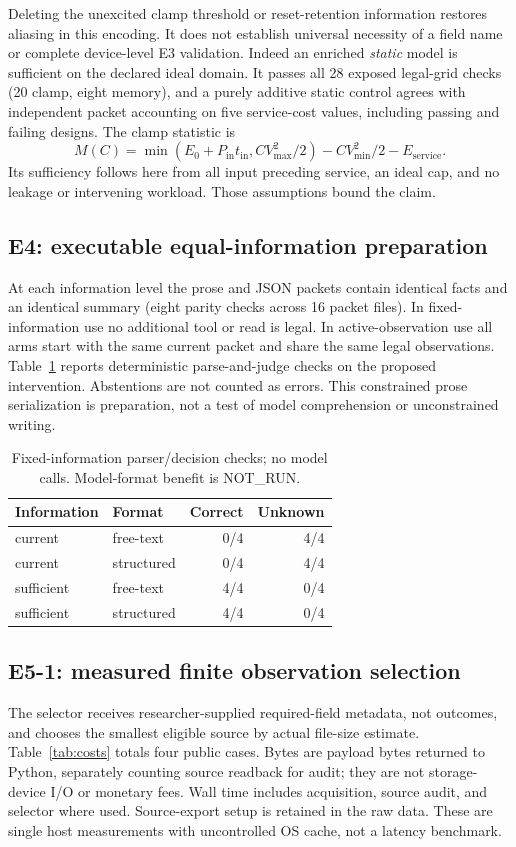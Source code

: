 \documentclass[10pt]{article}
\begin{document}
Deleting the unexcited clamp threshold or reset-retention information restores aliasing in this encoding. It does not establish universal necessity of a field name or complete device-level E3 validation. Indeed an enriched \emph{static} model is sufficient on the declared ideal domain. It passes all 28 exposed legal-grid checks (20 clamp, eight memory), and a purely additive static control agrees with independent packet accounting on five service-cost values, including passing and failing designs. The clamp statistic is
\[
 M(C)=\min(E_0+P_{\mathrm{in}}t_{\mathrm{in}},CV_{\max}^2/2)-CV_{\min}^2/2-E_{\mathrm{service}}.
\]
Its sufficiency follows here from all input preceding service, an ideal cap, and no leakage or intervening workload. Those assumptions bound the claim.

\subsection{E4: executable equal-information preparation}
At each information level the prose and JSON packets contain identical facts and an identical summary (eight parity checks across 16 packet files). In fixed-information use no additional tool or read is legal. In active-observation use all arms start with the same current packet and share the same legal observations. Table~\ref{tab:packets} reports deterministic parse-and-judge checks on the proposed intervention. Abstentions are not counted as errors. This constrained prose serialization is preparation, not a test of model comprehension or unconstrained writing.

\begin{table}[ht]
\centering
\begin{tabular}{llrr}
\toprule
Information & Format & Correct & Unknown \\
\midrule
current & free-text & 0/4 & 4/4 \\
current & structured & 0/4 & 4/4 \\
sufficient & free-text & 4/4 & 0/4 \\
sufficient & structured & 4/4 & 0/4 \\
\bottomrule
\end{tabular}
\caption{Fixed-information parser/decision checks; no model calls. Model-format benefit is NOT\_RUN.}
\label{tab:packets}
\end{table}

\subsection{E5-1: measured finite observation selection}
The selector receives researcher-supplied required-field metadata, not outcomes, and chooses the smallest eligible source by actual file-size estimate. Table~\ref{tab:costs} totals four public cases. Bytes are payload bytes returned to Python, separately counting source readback for audit; they are not storage-device I/O or monetary fees. Wall time includes acquisition, source audit, and selector where used. Source-export setup is retained in the raw data. These are single host measurements with uncontrolled OS cache, not a latency benchmark.
\end{document}
